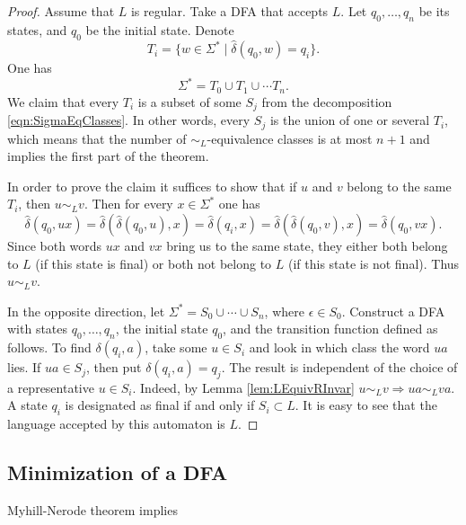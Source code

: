 \begin{page}
\setcounter{section}{4}
\setcounter{subsection}{3}
\setcounter{dfn}{7}
\label{portion:1195}

\begin{proof}
Assume that $L$ is regular.
Take a DFA that accepts $L$.
Let $q_0, \ldots, q_n$ be its states, and $q_0$ be the initial state.
Denote
\[
T_i = \{w \in \Sigma^* \mid \widehat{\delta}(q_0, w) = q_i\}.
\]
One has
\[
\Sigma^* = T_0 \cup T_1 \cup \cdots T_n.
\]
We claim that every $T_i$ is a subset of some $S_j$ from the decomposition \eqref{eqn:SigmaEqClasses}.
In other words, every $S_j$ is the union of one or several $T_i$,
which means that the number of $\sim_L$-equivalence classes is at most $n+1$ and implies the first part of the theorem.

In order to prove the claim it suffices to show that if $u$ and $v$ belong to the same $T_i$, then $u \sim_L v$.
Then for every $x \in \Sigma^*$ one has
\[
\widehat{\delta}(q_0, ux) = \widehat{\delta}(\widehat{\delta}(q_0,u), x) = \widehat{\delta}(q_i, x)
= \widehat{\delta}(\widehat{\delta}(q_0,v), x) = \widehat{\delta}(q_0, vx).
\]
Since both words $ux$ and $vx$ bring us to the same state, they either both belong to $L$ (if this state is final)
or both not belong to $L$ (if this state is not final).
Thus $u \sim_L v$.


In the opposite direction, let $\Sigma^* = S_0 \cup \cdots \cup S_n$, where $\epsilon \in S_0$.
Construct a DFA with states $q_0, \ldots, q_n$, the initial state $q_0$, and the transition function defined as follows.
To find $\delta(q_i, a)$, take some $u \in S_i$ and look in which class the word $ua$ lies.
If $ua \in S_j$, then put $\delta(q_i, a) = q_j$.
The result is independent of the choice of a representative $u \in S_i$.
Indeed, by Lemma \ref{lem:LEquivRInvar} $u \sim_L v \Rightarrow ua \sim_L va$.
A state $q_i$ is designated as final if and only if $S_i \subset L$.
It is easy to see that the language accepted by this automaton is $L$.
\end{proof}



\end{page}

\begin{page}
\setcounter{section}{4}
\setcounter{subsection}{3}
\setcounter{dfn}{7}
\label{portion:1197}

\subsection{Minimization of a DFA}
Myhill-Nerode theorem implies


\end{page}

